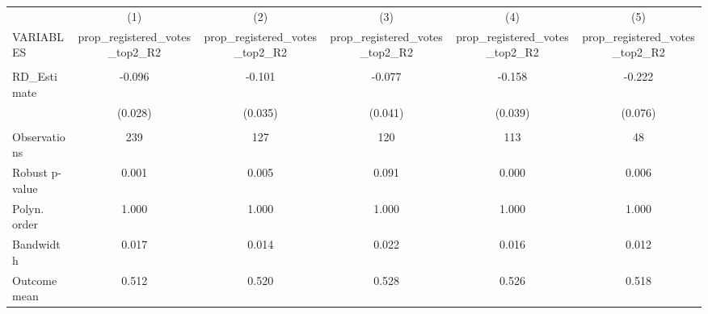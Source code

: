 \documentclass[]{article}
\begin{document}
\begin{tabular}{lccccc} \hline
 & (1) & (2) & (3) & (4) & (5) \\
VARIABLES & prop\_registered\_votes\_top2\_R2 & prop\_registered\_votes\_top2\_R2 & prop\_registered\_votes\_top2\_R2 & prop\_registered\_votes\_top2\_R2 & prop\_registered\_votes\_top2\_R2 \\ \hline
 &  &  &  &  &  \\
RD\_Estimate & -0.096 & -0.101 & -0.077 & -0.158 & -0.222 \\
 & (0.028) & (0.035) & (0.041) & (0.039) & (0.076) \\
 &  &  &  &  &  \\
Observations & 239 & 127 & 120 & 113 & 48 \\
Robust p-value & 0.001 & 0.005 & 0.091 & 0.000 & 0.006 \\
Polyn. order & 1.000 & 1.000 & 1.000 & 1.000 & 1.000 \\
Bandwidth & 0.017 & 0.014 & 0.022 & 0.016 & 0.012 \\
 Outcome mean & 0.512 & 0.520 & 0.528 & 0.526 & 0.518 \\ \hline
\end{tabular}
\end{document}
